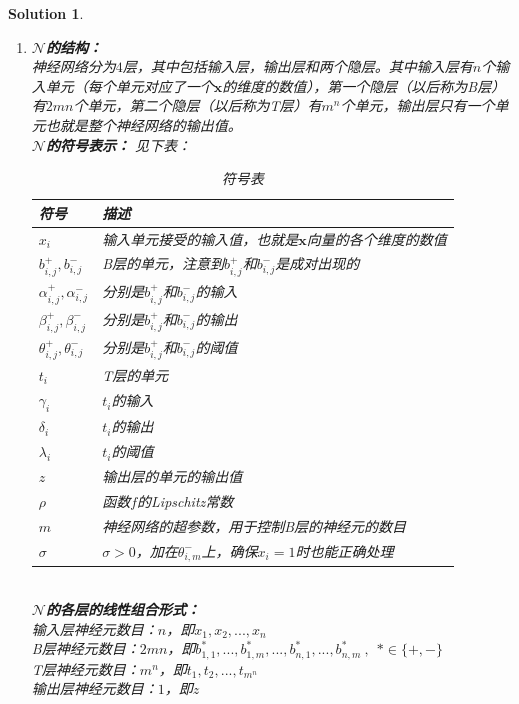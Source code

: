 \documentclass[a4paper,UTF8]{article}
\numberwithin{equation}{section}
\newtheorem*{solution}{Solution}
\begin{document}
\begin{solution}
\begin{enumerate}[ {(}1{)}]
\item 
\textbf{$\mathcal{N}$的结构：}\\
神经网络分为$4$层，其中包括输入层，输出层和两个隐层。其中输入层有$n$个输入单元（每个单元对应了一个$\mathbf{x}$的维度的数值），第一个隐层（以后称为B层）有$2mn$个单元，第二个隐层（以后称为T层）有$m^n$个单元，输出层只有一个单元也就是整个神经网络的输出值。\\
\textbf{$\mathcal{N}$的符号表示：}
见下表：
\begin{table}[!h]
	\centering
	\caption{符号表}
	\label{my-label}
	\begin{tabular}{|l|l|}
		\hline
	\textbf{符号}	& \textbf{描述} \\ \hline
	$x_i$	& 输入单元接受的输入值，也就是$ \mathbf{x} $向量的各个维度的数值 \\ \hline
	$b_{i,j}^+, b_{i,j}^-$	& B层的单元，注意到$b_{i,j}^+$和$b_{i,j}^-$是成对出现的 \\ \hline
	$\alpha_{i,j}^+,\alpha_{i,j}^-$	& 分别是$b_{i,j}^+$和$b_{i,j}^-$的输入 \\ \hline
	$\beta_{i,j}^+,\beta_{i,j}^-$	& 分别是$b_{i,j}^+$和$b_{i,j}^-$的输出 \\ \hline
	$\theta_{i,j}^+,\theta_{i,j}^-$	& 分别是$b_{i,j}^+$和$b_{i,j}^-$的阈值 \\ \hline
	$t_i$	& T层的单元 \\ \hline
	$\gamma_i$	& $t_i$的输入 \\ \hline
	$\delta_i$	& $t_i$的输出 \\ \hline
	$\lambda_i$	& $t_i$的阈值 \\ \hline
	$z$	& 输出层的单元的输出值 \\ \hline
	$\rho$	& 函数$f$的Lipschitz常数 \\ \hline
	$m$	& 神经网络的超参数，用于控制B层的神经元的数目\\ \hline
	$\sigma$	& $\sigma>0$，加在$\theta_{i,m}^-$上，确保$x_i=1$时也能正确处理\\ \hline
	\end{tabular}
\end{table}\\
\textbf{$\mathcal{N}$的各层的线性组合形式：}\\
输入层神经元数目：$n$，即$x_1, x_2,...,x_n$\\
B层神经元数目：$2mn$，即$b_{1,1}^*,...,b_{1,m}^*,...,b_{n,1}^*,...,b_{n,m}^*\ ,\ \ *\in \{+,-\}$\\
T层神经元数目：$m^n$，即$t_1,t_2,...,t_{m^n}$\\
输出层神经元数目：$1$，即$z$\\

\end{enumerate}
\end{solution}
\end{document}

